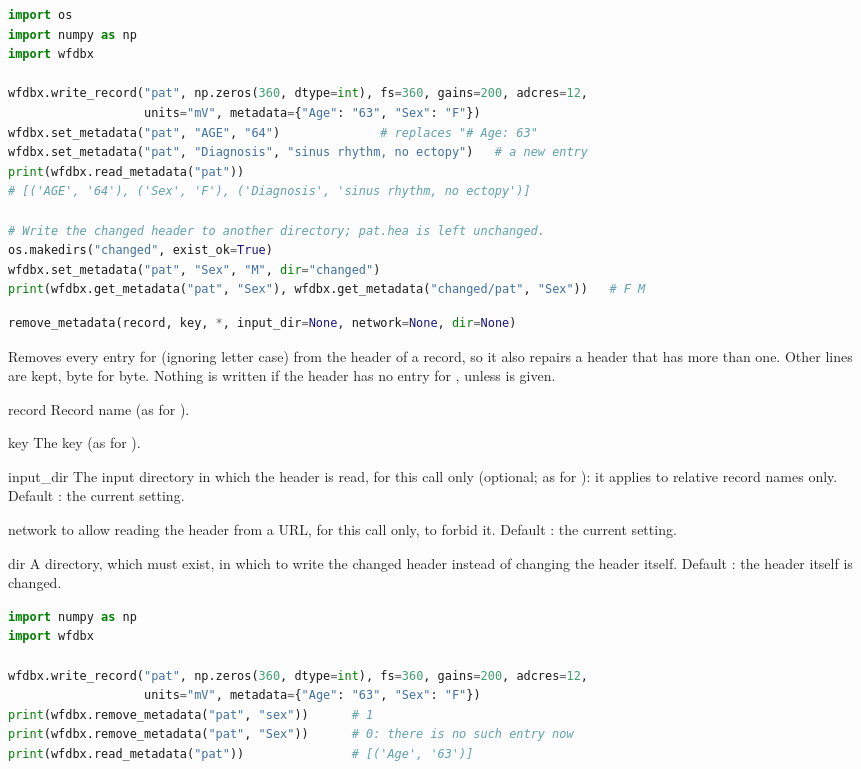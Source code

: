 \begin{lstlisting}[language=Python,style=example]
import os
import numpy as np
import wfdbx

wfdbx.write_record("pat", np.zeros(360, dtype=int), fs=360, gains=200, adcres=12,
                   units="mV", metadata={"Age": "63", "Sex": "F"})
wfdbx.set_metadata("pat", "AGE", "64")              # replaces "# Age: 63"
wfdbx.set_metadata("pat", "Diagnosis", "sinus rhythm, no ectopy")   # a new entry
print(wfdbx.read_metadata("pat"))
# [('AGE', '64'), ('Sex', 'F'), ('Diagnosis', 'sinus rhythm, no ectopy')]

# Write the changed header to another directory; pat.hea is left unchanged.
os.makedirs("changed", exist_ok=True)
wfdbx.set_metadata("pat", "Sex", "M", dir="changed")
print(wfdbx.get_metadata("pat", "Sex"), wfdbx.get_metadata("changed/pat", "Sex"))   # F M
\end{lstlisting}

\begin{lstlisting}[language=Python,style=signature]
remove_metadata(record, key, *, input_dir=None, network=None, dir=None)
\end{lstlisting}
Removes every entry for  (ignoring letter case) from the header of a record, so
it also repairs a header that has more than one. Other lines are kept, byte for byte.
Nothing is written if the header has no entry for , unless  is given.
\begin{params}
\item[record] Record name (as for ).
\item[key] The key (as for ).
\item[input\_dir] The input directory in which the header is read, for this call only
  (optional; as for ): it applies to relative record names only.
  Default : the current setting.
\item[network]  to allow reading the header from a URL, for this call only,
   to forbid it. Default : the current setting.
\item[dir] A directory, which must exist, in which to write the changed header instead of
  changing the header itself. Default : the header itself is changed.
\end{params}
\begin{lstlisting}[language=Python,style=example]
import numpy as np
import wfdbx

wfdbx.write_record("pat", np.zeros(360, dtype=int), fs=360, gains=200, adcres=12,
                   units="mV", metadata={"Age": "63", "Sex": "F"})
print(wfdbx.remove_metadata("pat", "sex"))      # 1
print(wfdbx.remove_metadata("pat", "Sex"))      # 0: there is no such entry now
print(wfdbx.read_metadata("pat"))               # [('Age', '63')]
\end{lstlisting}

